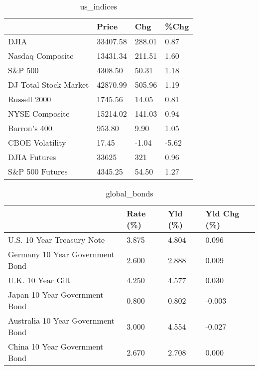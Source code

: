 \documentclass{article}%
\begin{document}
%


\begin{table}[htbp]%
\caption{us\_indices}%
\centering%
\begin{adjustbox}{width=1\textwidth}%
\begin{tabular}{llll}
\toprule
                      &    Price &    Chg &  \%Chg \\
\midrule
                 DJIA & 33407.58 & 288.01 &  0.87 \\
     Nasdaq Composite & 13431.34 & 211.51 &  1.60 \\
              S\&P 500 &  4308.50 &  50.31 &  1.18 \\
DJ Total Stock Market & 42870.99 & 505.96 &  1.19 \\
         Russell 2000 &  1745.56 &  14.05 &  0.81 \\
       NYSE Composite & 15214.02 & 141.03 &  0.94 \\
         Barron's 400 &   953.80 &   9.90 &  1.05 \\
      CBOE Volatility &    17.45 &  -1.04 & -5.62 \\
         DJIA Futures &    33625 &    321 &  0.96 \\
      S\&P 500 Futures &  4345.25 &  54.50 &  1.27 \\
\bottomrule
\end{tabular}
%
\end{adjustbox}%
\end{table}

%


\begin{table}[htbp]%
\caption{global\_bonds}%
\centering%
\begin{adjustbox}{width=1\textwidth}%
\begin{tabular}{llll}
\toprule
                                  & Rate (\%) & Yld (\%) & Yld Chg (\%) \\
\midrule
       U.S. 10 Year Treasury Note &    3.875 &   4.804 &       0.096 \\
  Germany 10 Year Government Bond &    2.600 &   2.888 &       0.009 \\
                U.K. 10 Year Gilt &    4.250 &   4.577 &       0.030 \\
    Japan 10 Year Government Bond &    0.800 &   0.802 &      -0.003 \\
Australia 10 Year Government Bond &    3.000 &   4.554 &      -0.027 \\
    China 10 Year Government Bond &    2.670 &   2.708 &       0.000 \\
\bottomrule
\end{tabular}
%
\end{adjustbox}%
\end{table}
\end{document}
